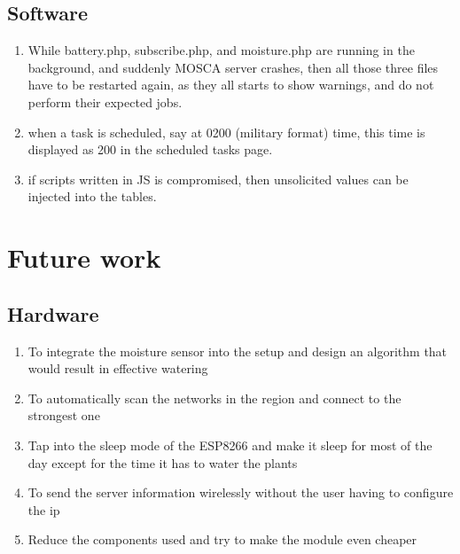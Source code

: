 \documentclass[16pt]{article}
\begin{document}
\subsection{Software}
\begin{enumerate}
 \item While battery.php, subscribe.php, and moisture.php are running in the background, and suddenly MOSCA server crashes, then all those three files have to be restarted again, as they all starts to show warnings, and do not perform their expected jobs.
 \item when a task is scheduled, say at 0200 (military format) time, this time is displayed as 200 in the scheduled tasks page.
 \item if scripts written in JS is compromised, then unsolicited values can be injected into the tables.
\end{enumerate}


\vspace{19cm}

\section{Future work}

\vspace{0.5cm}

\subsection{Hardware}
\begin{enumerate}
 \item To integrate the moisture sensor into the setup and design an algorithm that would result in effective watering 
 \item To automatically scan the networks in the region and connect to the strongest one
 \item Tap into the sleep mode of the ESP8266 and make it sleep for most of the day except for the time 
 it has to water the plants
 \item To send the server information wirelessly without the user having to configure the ip
 \item Reduce the components used and try to make the module even cheaper  
\end{enumerate}

\vspace{0.5cm}
\end{document}
